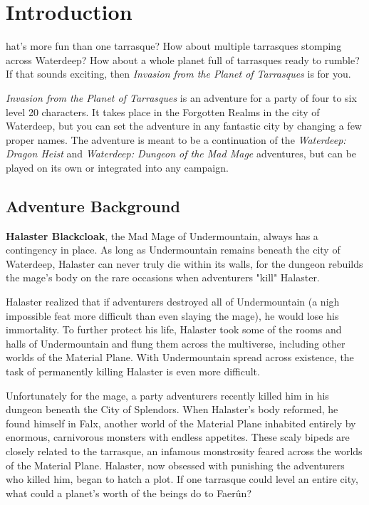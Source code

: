 \documentclass[10pt,a4paper,twoside,bg=print,twocolumn,openany,nodeprecatedcode]{dndbook}
\begin{document}
\chapter*{Introduction}
hat's more fun than one tarrasque? How about multiple tarrasques stomping across Waterdeep? How about a whole planet full of tarrasques ready to rumble? If that sounds exciting, then \textit{Invasion from the Planet of Tarrasques} is for you.


\textit{Invasion from the Planet of Tarrasques} is an adventure for a party of four to six level 20 characters. It takes place in the Forgotten Realms in the city of Waterdeep, but you can set the adventure in any fantastic city by changing a few proper names. The adventure is meant to be a continuation of the \textit{Waterdeep: Dragon Heist} and \textit{Waterdeep: Dungeon of the Mad Mage} adventures, but can be played on its own or integrated into any campaign.

\section{Adventure Background}
\textbf{Halaster Blackcloak}, the Mad Mage of Undermountain, always has a contingency in place. As long as Undermountain remains beneath the city of Waterdeep, Halaster can never truly die within its walls, for the dungeon rebuilds the mage's body on the rare occasions when adventurers "kill" Halaster.

Halaster realized that if adventurers destroyed all of Undermountain (a nigh impossible feat more  difficult than even slaying the mage), he would lose his immortality.  To further protect his life, Halaster took some of the rooms and halls of Undermountain and flung them across the multiverse, including other worlds of the Material Plane. With Undermountain spread across existence, the task of permanently killing Halaster is even more difficult.

Unfortunately for the mage, a party adventurers recently killed him in his dungeon beneath the City of Splendors. When Halaster's body reformed, he found himself in Falx, another world of the Material Plane inhabited entirely by enormous, carnivorous monsters with endless appetites. These scaly bipeds are closely related to the tarrasque, an infamous monstrosity feared across the worlds of the Material Plane. Halaster, now obsessed with punishing the adventurers who killed him, began to hatch a plot. If one tarrasque could level an entire city, what could a planet's worth of the beings do to Faerûn?
\end{document}
